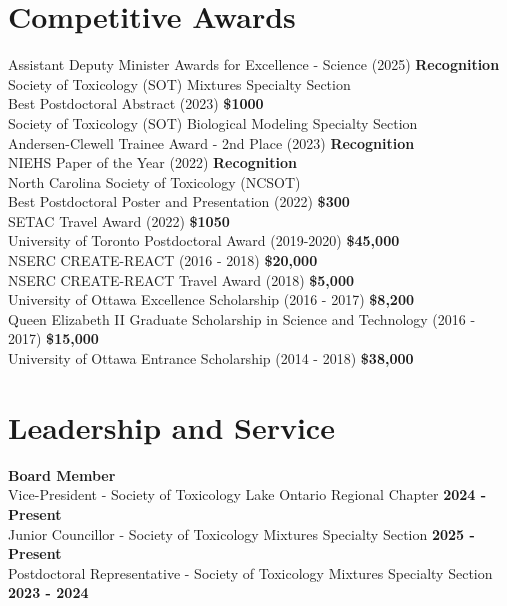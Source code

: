 \documentclass[margin,line]{res}
\newcommand\tab[1][1cm]{\hspace*{#1}}
\begin{document}
\begin{resume}
\section{\sc Competitive Awards}

Assistant Deputy Minister Awards for Excellence - Science (2025)
\hfill {\textbf{Recognition}}\\
Society of Toxicology (SOT) Mixtures Specialty Section\\
\tab Best Postdoctoral Abstract (2023)
\hfill {\textbf{\$1000}}\\
Society of Toxicology (SOT) Biological Modeling Specialty Section\\
\tab Andersen-Clewell Trainee Award - 2nd Place (2023)
\hfill {\textbf{Recognition}}\\
NIEHS Paper of the Year (2022)
\hfill {\textbf{Recognition}}\\
North Carolina Society of Toxicology (NCSOT)\\
\tab Best Postdoctoral Poster and Presentation (2022)
\hfill {\textbf{\$300}}\\
SETAC Travel Award (2022)
\hfill {\textbf{\$1050}}\\
University of Toronto Postdoctoral Award (2019-2020)
\hfill {\textbf{\$45,000}}\\
NSERC CREATE-REACT (2016 - 2018)
\hfill {\textbf{\$20,000}}\\
NSERC CREATE-REACT Travel Award (2018)
\hfill {\textbf{\$5,000}}\\
University of Ottawa Excellence Scholarship (2016 - 2017)
\hfill {\textbf{\$8,200}}\\
Queen Elizabeth II Graduate Scholarship in Science and Technology (2016 - 2017)
\hfill {\textbf{\$15,000}}\\
University of Ottawa Entrance Scholarship (2014 - 2018)
\hfill {\textbf{\$38,000}}\\

\vspace*{.1in}

\section{\sc Leadership and Service}
{\bf Board Member}\\
{Vice-President - Society of Toxicology Lake Ontario Regional Chapter} \hfill {\bf 2024 - Present}\\
{Junior Councillor - Society of Toxicology Mixtures Specialty Section} \hfill {\bf 2025 - Present}\\
{Postdoctoral Representative - Society of Toxicology Mixtures Specialty Section} \hfill {\bf 2023 - 2024}\\



\end{resume}
\end{document}
